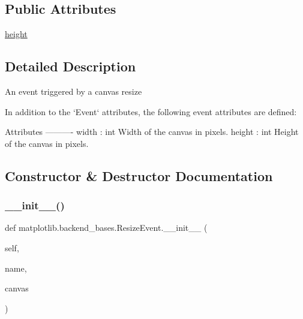 \subsection*{Public Attributes}
\begin{DoxyCompactItemize}
\item 
\hyperlink{classmatplotlib_1_1backend__bases_1_1ResizeEvent_acb8d277420a1f2785d679252c762e645}{height}
\end{DoxyCompactItemize}


\subsection{Detailed Description}
\begin{DoxyVerb}An event triggered by a canvas resize

In addition to the `Event` attributes, the following event
attributes are defined:

Attributes
----------
width : int
    Width of the canvas in pixels.
height : int
    Height of the canvas in pixels.
\end{DoxyVerb}
 

\subsection{Constructor \& Destructor Documentation}
\mbox{\label{classmatplotlib_1_1backend__bases_1_1ResizeEvent_af4b8bd88cf5073bda283f728c7c60725}} 
\subsubsection{\texorpdfstring{\+\_\+\+\_\+init\+\_\+\+\_\+()}{\_\_init\_\_()}}
{\footnotesize\ttfamily def matplotlib.\+backend\+\_\+bases.\+Resize\+Event.\+\_\+\+\_\+init\+\_\+\+\_\+ (\begin{DoxyParamCaption}\item[{}]{self,  }\item[{}]{name,  }\item[{}]{canvas }\end{DoxyParamCaption})}



